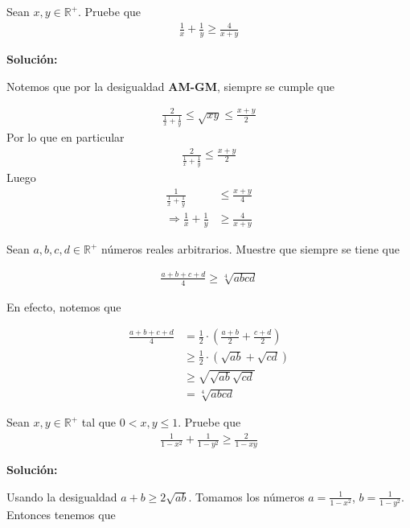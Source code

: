 \documentclass[12pt]{book}
\begin{document}
\begin{prob}{}{}
    Sean $x,y \in \mathbb{R}^+$. Pruebe que 
\begin{align*}
    \frac{1}{x}+\frac{1}{y}\geq \frac{4}{x+y}
\end{align*}
\end{prob}
\textbf{Solución:}

Notemos que por la desigualdad \textbf{AM-GM}, siempre se cumple que

\begin{align*}
    \frac{2}{\frac{1}{x}+\frac{1}{y}}\leq\sqrt{xy}\leq\frac{x+y}{2}
\end{align*}
Por lo que en particular
\begin{align*}
  \frac{2}{\frac{1}{x}+\frac{1}{y}}\leq \frac{x+y}{2}
\end{align*}
Luego 
\begin{align*}
     \frac{1}{\frac{1}{x}+\frac{1}{y}}&\leq\frac{x+y}{4} \\
     \Longrightarrow \frac{1}{x}+\frac{1}{y}&\geq \frac{4}{x+y}
\end{align*}
\begin{prob}{}{}
    Sean $a,b,c,d \in \mathbb{R}^+$ números reales arbitrarios. Muestre que siempre se tiene que 

    \begin{align*}
        \frac{a+b+c+d}{4}\geq \sqrt[4]{abcd}
    \end{align*}
\end{prob}
En efecto, notemos que 

\begin{align*}
    \frac{a+b+c+d}{4}&=\frac{1}{2}\cdot \left(\frac{a+b}{2}+\frac{c+d}{2} \right) \\
    &\geq \frac{1}{2}\cdot(\sqrt{ab}+\sqrt{cd}) \\
   &\geq \sqrt{\sqrt{ab}\sqrt{cd}} \\
   &=\sqrt[4]{abcd}
\end{align*}

\begin{prob}{}{}
    Sean $x,y \in \mathbb{R}^+$ tal que $0<x,y\leq 1$. Pruebe que 
    \begin{align*}
        \frac{1}{1-x^2}+\frac{1}{1-y^2}\geq \frac{2}{1-xy}
    \end{align*}
\end{prob}
\textbf{Solución:}

Usando la desigualdad $a+b \geq 2 \sqrt{ab}$. Tomamos los números $\displaystyle a=\frac{1}{1-x^2}$, $\displaystyle b=\frac{1}{1-y^2}$. Entonces tenemos que 
\end{document}
